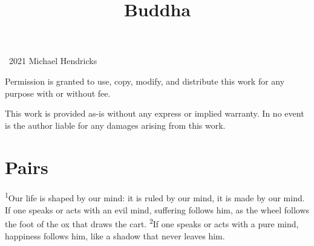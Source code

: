 \documentclass[openany,12pt,english]{book}
\title{Buddha}
\author{}
\date{}
\newenvironment{para}{\par\pretolerance=100\tolerance=200\setlength{\emergencystretch}{0.6em}\relax}{\par}
\begin{document}
\maketitle

{
\thispagestyle{empty}
\vspace*{\fill}
\begin{changemargin}{.8in}{.8in}
\begin{center}
\textcopyright{}~2021 Michael Hendricks

\vspace{0.5\baselineskip}

Permission is granted to use, copy, modify, and distribute
this work for any purpose with or without fee.

\vspace{0.5\baselineskip}

This work is provided as-is without any express or implied
warranty. In no event is the author liable for any damages
arising from this work.
\end{center}
\end{changemargin}
}
\clearpage{}

\tableofcontents
\clearpage{}

\markboth{}{}


\section*{Pairs}
\begin{para}
    \textsuperscript{1}\thinspace{}Our life is shaped by our mind: it is ruled by our mind, it is made by our mind. If one speaks or acts with an evil mind, suf\-fer\-ing follows him, as the wheel follows the foot of the ox that draws the cart.
    \textsuperscript{2}\thinspace{}If one speaks or acts with a pure mind, hap\-pi\-ness follows him, like a shad\-ow that nev\-er leaves him.
\end{para}
\end{document}
